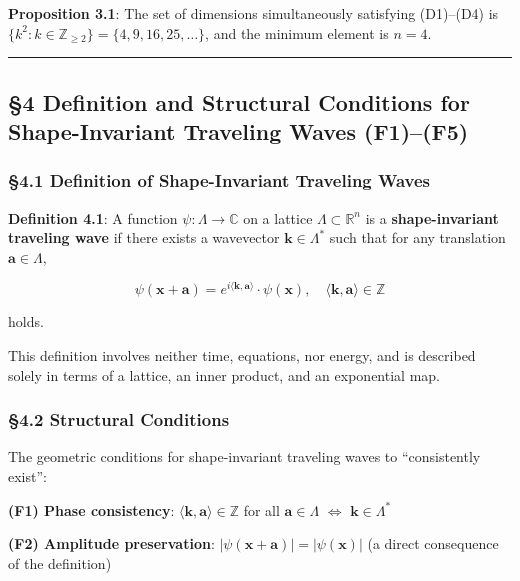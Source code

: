 \documentclass[
  a4paper,11pt]{article}
\theoremstyle{definition}
\theoremstyle{remark}
\begin{document}
\textbf{Proposition 3.1}: The set of dimensions simultaneously
satisfying (D1)--(D4) is
\(\{k^2 : k \in \mathbb{Z}_{\geq 2}\} = \{4, 9, 16, 25, \ldots\}\), and
the minimum element is \(n = 4\).

\begin{center}\rule{0.5\linewidth}{0.5pt}\end{center}

\subsection{§4 Definition and Structural Conditions for Shape-Invariant
Traveling Waves
(F1)--(F5)}\label{definition-and-structural-conditions-for-shape-invariant-traveling-waves-f1f5}

\subsubsection{§4.1 Definition of Shape-Invariant Traveling
Waves}\label{definition-of-shape-invariant-traveling-waves}

\textbf{Definition 4.1}: A function \(\psi : \Lambda \to \mathbb{C}\) on
a lattice \(\Lambda \subset \mathbb{R}^n\) is a \textbf{shape-invariant
traveling wave} if there exists a wavevector
\(\mathbf{k} \in \Lambda^*\) such that for any translation
\(\mathbf{a} \in \Lambda\),

\[\psi(\mathbf{x} + \mathbf{a}) = e^{i\langle \mathbf{k}, \mathbf{a} \rangle} \cdot \psi(\mathbf{x}), \quad \langle \mathbf{k}, \mathbf{a} \rangle \in \mathbb{Z}\]

holds.

This definition involves neither time, equations, nor energy, and is
described solely in terms of a lattice, an inner product, and an
exponential map.

\subsubsection{§4.2 Structural Conditions}\label{structural-conditions}

The geometric conditions for shape-invariant traveling waves to
``consistently exist'':

\textbf{(F1) Phase consistency}:
\(\langle \mathbf{k}, \mathbf{a} \rangle \in \mathbb{Z}\) for all
\(\mathbf{a} \in \Lambda\) \(\Leftrightarrow\)
\(\mathbf{k} \in \Lambda^*\)

\textbf{(F2) Amplitude preservation}:
\(|\psi(\mathbf{x} + \mathbf{a})| = |\psi(\mathbf{x})|\) (a direct
consequence of the definition)
\end{document}
